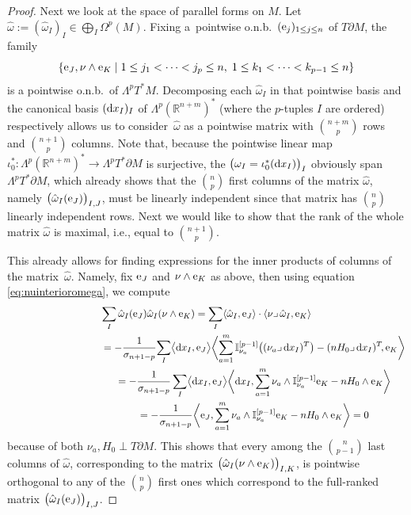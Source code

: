 \begin{proof}
Next we look at the space of parallel forms on $M$. Let $\hat{\omega}:=\left(\hat{\omega}_I\right)_I\in\bigoplus_I\Omega^p(M)$. Fixing a~pointwise o.n.b.\ $({\rm e}_j)_{1\leq j\leq n}$ of $T\partial M$, the family
\[\left\{{\rm e}_J,\nu\wedge {\rm e}_K \mid 1\leq j_1<\dots< j_p\leq n,\;1\leq k_1<\dots<k_{p-1}\leq n \right\}\]
is a pointwise o.n.b.\ of $\Lambda^pT^*M$. Decomposing each $\hat{\omega}_I$ in that pointwise basis and the canonical basis $({\rm d}x_I)_I$ of $\Lambda^p(\mathbb{R}^{n+m})^*$ (where the $p$-tuples $I$ are ordered) respectively allows us to consider~$\hat{\omega}$ as a pointwise matrix with $\binom{n+m}{p}$ rows and $\binom{n+1}{p}$ columns.
Note that, because the pointwise linear map $\iota_0^*\colon\Lambda^p(\mathbb{R}^{n+m})^*\to\Lambda^pT^*\partial M$ is  surjective, the $\bigl(\omega_I=\iota_0^*({\rm d}x_I)\bigr)_I$ obviously span $\Lambda^pT^*\partial M$, which already shows that the $\binom{n}{p}$ first columns of the matrix $\hat{\omega}$, namely $\bigl(\hat{\omega}_I({\rm e}_J)\bigr)_{I,J}$, must be linearly independent since that matrix has $\binom{n}{p}$ linearly independent rows. Next we would like to show that the rank of the whole matrix $\hat{\omega}$ is maximal, i.e., equal to $\binom{n+1}{p}$.

This already allows for finding expressions for the inner products of columns of the matrix~$\hat{\omega}$.
Namely, fix ${\rm e}_J$ and $\nu\wedge {\rm e}_K$ as above, then using equation \eqref{eq:nuinterioromega}, we compute
\begin{gather*}
\sum_I\hat{\omega}_I({\rm e}_J)\hat{\omega}_I(\nu\wedge {\rm e}_K)=\sum_I\langle\hat{\omega}_I,{\rm e}_J\rangle\cdot\langle\nu\lrcorner\,\hat{\omega}_I,{\rm e}_K\rangle\\
\hphantom{\sum_I\hat{\omega}_I({\rm e}_J)\hat{\omega}_I(\nu\wedge {\rm e}_K)}=-\frac{1}{\sigma_{n+1-p}}\!\sum_I\bigl\langle{\rm d}x_I,{\rm e}_J\bigr\rangle\biggl\langle\sum_{a=1}^m\mathbb{I}_{\nu_a}^{[p-1]}\bigl((\nu_a\lrcorner\,{\rm d}x_I)^T\bigr)-(nH_0\lrcorner\,{\rm d}x_I)^T\!, {\rm e}_K\biggr\rangle\\
\hphantom{\sum_I\hat{\omega}_I({\rm e}_J)\hat{\omega}_I(\nu\wedge {\rm e}_K)}=-\frac{1}{\sigma_{n+1-p}}\sum_I \bigl\langle {\rm d}x_I,{\rm e}_J\bigr\rangle\biggl\langle {\rm d}x_I,\sum_{a=1}^m\nu_a\wedge\mathbb{I}_{\nu_a}^{[p-1]}{\rm e}_K-nH_0\wedge {\rm e}_K\biggr\rangle\\
\hphantom{\sum_I\hat{\omega}_I({\rm e}_J)\hat{\omega}_I(\nu\wedge {\rm e}_K)}=-\frac{1}{\sigma_{n+1-p}}\biggl\langle {\rm e}_J,\sum_{a=1}^m \nu_a\wedge\mathbb{I}_{\nu_a}^{[p-1]}{\rm e}_K-nH_0\wedge {\rm e}_K \biggr\rangle
=0
\end{gather*}
because of both $\nu_a,H_0\perp T\partial M$. This shows that every among the $\binom{n}{p-1}$ last columns of $\hat{\omega}$, corresponding to the matrix $\bigl(\hat{\omega}_I(\nu\wedge {\rm e}_K)\bigr)_{I,K}$, is pointwise orthogonal to any of the $\binom{n}{p}$ first ones which correspond to the full-ranked matrix $\bigl(\hat{\omega}_I({\rm e}_J)\bigr)_{I,J}$.


\end{proof}
